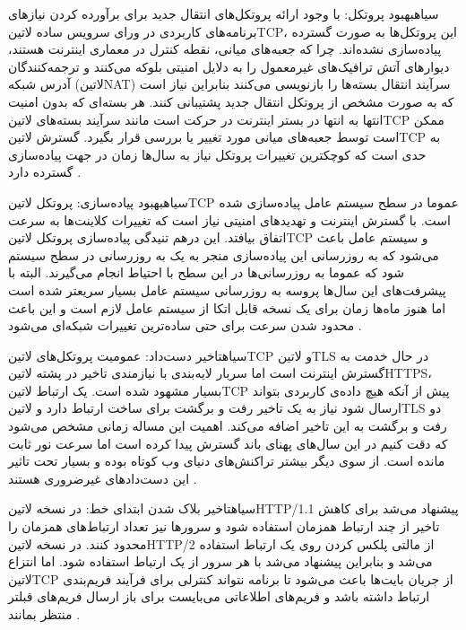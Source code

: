 ‌سیاه{بهبود پروتکل}: با وجود ارائه پروتکل‌های انتقال جدید برای برآورده کردن نیازهای برنامه‌های کاربردی در ورای سرویس ساده ‌لاتین{TCP}، این پروتکل‌ها به صورت گسترده پیاده‌سازی نشده‌اند.
چرا که جعبه‌های میانی، نقطه کنترل در معماری اینترنت هستند، دیوارهای آتش ترافیک‌های غیرمعمول را به دلایل امنیتی بلوکه می‌کنند و ترجمه‌کنندگان آدرس شبکه (‌لاتین{NAT})
سرآیند انتقال بسته‌ها را بازنویسی می‌کنند بنابراین نیاز است که به صورت مشخص از پروتکل انتقال جدید پشتیبانی کنند.
هر بسته‌ای که بدون امنیت انتها به انتها در بستر اینترنت در حرکت است مانند سرآیند بسته‌های ‌لاتین{TCP} ممکن است توسط جعبه‌های میانی مورد تغییر یا بررسی قرار بگیرد.
گسترش ‌لاتین{TCP} به حدی است که کوچکترین تغییرات پروتکل نیاز به سال‌ها زمان در جهت پیاده‌سازی گسترده دارد
.

‌سیاه{بهبود پیاده‌سازی}: پروتکل ‌لاتین{TCP} عموما در سطح سیستم عامل پیاده‌سازی شده است. با گسترش اینترنت و تهدیدهای امنیتی نیاز است که تغییرات کلاینت‌ها به سرعت اتفاق بیافتد.
این درهم تنیدگی پیاده‌سازی پروتکل ‌لاتین{TCP} و سیستم عامل باعث می‌شود که به روزرسانی این پیاده‌سازی منجر به یک به روزرسانی در سطح سیستم شود که عموما به روزرسانی‌ها در این سطح
با احتیاط انجام می‌گیرند. البته با پیشرفت‌های این سال‌ها پروسه به روزرسانی سیستم عامل بسیار سریعتر شده است اما هنوز ماه‌ها زمان برای یک نسخه قابل اتکا از سیستم عامل لازم است و این باعث
محدود شدن سرعت برای حتی ساده‌ترین تغییرات شبکه‌ای می‌شود
.

‌سیاه{تاخیر دست‌داد}: عمومیت پروتکل‌های ‌لاتین{TCP} و ‌لاتین{TLS} در حال خدمت به گسترش اینترنت است اما سربار لایه‌بندی با نیازمندی تاخیر در پشته ‌لاتین{HTTPS}،
بسیار مشهود شده است. یک ارتباط ‌لاتین{TCP} پیش از آنکه هیچ داده‌ی کاربردی بتواند ارسال شود نیاز به یک تاخیر رفت و برگشت برای ساخت ارتباط دارد و ‌لاتین{TLS} دو رفت و برگشت
به این تاخیر اضافه می‌کند. اهمیت این مساله زمانی مشخص می‌شود که دقت کنیم در این سال‌های پهنای باند گسترش پیدا کرده است اما سرعت نور ثابت مانده است. از سوی دیگر بیشتر تراکنش‌های دنیای وب
کوتاه بوده و بسیار تحت تاثیر این دست‌دادهای غیرضروری هستند
.

‌سیاه{تاخیر بلاک شدن ابتدای خط}: در نسخه ‌لاتین{HTTP/1.1} پیشنهاد می‌شد برای کاهش تاخیر از چند ارتباط همزمان استفاده شود و سرورها نیز تعداد ارتباط‌های همزمان را محدود کنند.
در نسخه ‌لاتین{HTTP/2} از مالتی پلکس کردن روی یک ارتباط استفاده می‌شد و بنابراین پیشنهاد می‌شد با هر سرور از یک ارتباط استفاده شود.
اما انتزاع ‌لاتین{TCP} از جریان بایت‌ها باعث می‌شود تا برنامه نتواند کنترلی برای فرآیند فریم‌بندی ارتباط داشته باشد و فریم‌های اطلاعاتی می‌بایست برای باز ارسال فریم‌های قبلتر منتظر بمانند
.

